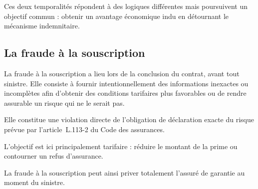 Ces deux temporalités répondent à des logiques différentes mais poursuivent un objectif commun : obtenir un avantage économique indu en détournant le mécanisme indemnitaire.

\subsection{La fraude à la souscription}

La fraude à la souscription a lieu lors de la conclusion du contrat, avant tout sinistre. Elle consiste à fournir intentionnellement des informations inexactes ou incomplètes afin d'obtenir des conditions tarifaires plus favorables ou de rendre assurable un risque qui ne le serait pas.

Elle constitue une violation directe de l'obligation de déclaration exacte du risque prévue par l'article~L.113-2 du Code des assurances.

L'objectif est ici principalement tarifaire : réduire le montant de la prime ou contourner un refus d'assurance.

La fraude à la souscription peut ainsi priver totalement l'assuré de garantie au moment du sinistre.

